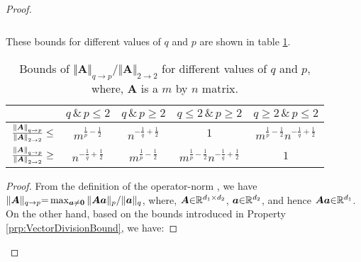 \begin{proof}
\begin{property}
\begin{gather*}
\begin{aligned}
\end{aligned}
\end{gather*}
These bounds for different values of $q$ and $p$ are shown in table \ref{table:qpTO22}.
\begin{table}[bp]
\centering
\begin{tabular}{ccccc}
\toprule
\multicolumn{1}{c}{} &\multicolumn{1}{c}{${q\, \& \, p \leq 2}$} & \multicolumn{1}{c}{${q\, \& \, p \geq 2}$}  & \multicolumn{1}{c}{${q \leq 2\, \& \, p \geq 2}$} & \multicolumn{1}{c}{${q \geq 2\, \& \, p \leq 2}$} \\ \midrule %
\multicolumn{1}{r}{${\frac{\left\lVert\boldsymbol{A}\right\rVert_{q \to p}}{\left\lVert\boldsymbol{A}\right\rVert_{2 \to 2}} \leq}$} &\multicolumn{1}{c}{$m^{\frac1p - \frac12}$} & \multicolumn{1}{c}{$n^{-\frac1q + \frac12}$} & \multicolumn{1}{c}{$1$} &\multicolumn{1}{c}{$m^{\frac1p - \frac12} n^{-\frac1q + \frac12}$}    \\ %
\multicolumn{1}{r}{${\frac{\left\lVert\boldsymbol{A}\right\rVert_{q \to p}}{\left\lVert\boldsymbol{A}\right\rVert_{2 \to 2}} \geq}$} &\multicolumn{1}{c}{$n^{-\frac1q + \frac12}$} & \multicolumn{1}{c}{$m^{\frac1p - \frac12}$} & \multicolumn{1}{c}{$m^{\frac1p - \frac12} n^{-\frac1q + \frac12}$} &\multicolumn{1}{c}{$1$}    \\
\bottomrule %
\end{tabular}
\caption{Bounds of $\Vert \boldsymbol{A} \Vert_{q \to p}/ \Vert \boldsymbol{A} \Vert_{2 \to 2}$ for different values of $q$ and $p$, where, $\boldsymbol{A}$ is a $m$ by $n$ matrix.}
\label{table:qpTO22}
\end{table}
\end{property}
\iffalse
\begin{proof}%
From the definition of the operator-norm \cite{Tropp2004b,Golub2013}, we have $\Vert \boldsymbol{A}\Vert_{q \to p} {=} \max_{\boldsymbol{a} \neq \boldsymbol{0}} \Vert \boldsymbol{Aa}\Vert_p {/} \Vert \boldsymbol{a}\Vert_q$, where, $\boldsymbol{A} {\in} \mathbb{R}^{d_1 {\times} d_2}$, $\boldsymbol{a} {\in} \mathbb{R}^{d_2}$, and hence $\boldsymbol{Aa} {\in} \mathbb{R}^{d_1}$.
On the other hand, based on the bounds introduced in Property \ref{prp:VectorDivisionBound}, we have:



\end{proof}
\end{proof}
